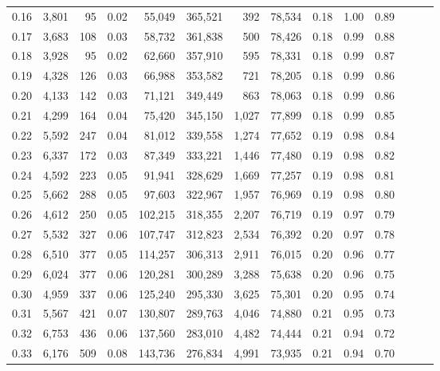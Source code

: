\begin{tabular}{rrrrrrrrrrrrrr}
0.16 &   3,801 &     95 &  0.02 &   55,049 &  365,521 &     392 &  78,534 &  0.18 &  1.00 &      0.89 \\
0.17 &   3,683 &    108 &  0.03 &   58,732 &  361,838 &     500 &  78,426 &  0.18 &  0.99 &      0.88 \\
0.18 &   3,928 &     95 &  0.02 &   62,660 &  357,910 &     595 &  78,331 &  0.18 &  0.99 &      0.87 \\
0.19 &   4,328 &    126 &  0.03 &   66,988 &  353,582 &     721 &  78,205 &  0.18 &  0.99 &      0.86 \\
0.20 &   4,133 &    142 &  0.03 &   71,121 &  349,449 &     863 &  78,063 &  0.18 &  0.99 &      0.86 \\
0.21 &   4,299 &    164 &  0.04 &   75,420 &  345,150 &   1,027 &  77,899 &  0.18 &  0.99 &      0.85 \\
0.22 &   5,592 &    247 &  0.04 &   81,012 &  339,558 &   1,274 &  77,652 &  0.19 &  0.98 &      0.84 \\
0.23 &   6,337 &    172 &  0.03 &   87,349 &  333,221 &   1,446 &  77,480 &  0.19 &  0.98 &      0.82 \\
0.24 &   4,592 &    223 &  0.05 &   91,941 &  328,629 &   1,669 &  77,257 &  0.19 &  0.98 &      0.81 \\
0.25 &   5,662 &    288 &  0.05 &   97,603 &  322,967 &   1,957 &  76,969 &  0.19 &  0.98 &      0.80 \\
0.26 &   4,612 &    250 &  0.05 &  102,215 &  318,355 &   2,207 &  76,719 &  0.19 &  0.97 &      0.79 \\
0.27 &   5,532 &    327 &  0.06 &  107,747 &  312,823 &   2,534 &  76,392 &  0.20 &  0.97 &      0.78 \\
0.28 &   6,510 &    377 &  0.05 &  114,257 &  306,313 &   2,911 &  76,015 &  0.20 &  0.96 &      0.77 \\
0.29 &   6,024 &    377 &  0.06 &  120,281 &  300,289 &   3,288 &  75,638 &  0.20 &  0.96 &      0.75 \\
0.30 &   4,959 &    337 &  0.06 &  125,240 &  295,330 &   3,625 &  75,301 &  0.20 &  0.95 &      0.74 \\
0.31 &   5,567 &    421 &  0.07 &  130,807 &  289,763 &   4,046 &  74,880 &  0.21 &  0.95 &      0.73 \\
0.32 &   6,753 &    436 &  0.06 &  137,560 &  283,010 &   4,482 &  74,444 &  0.21 &  0.94 &      0.72 \\
0.33 &   6,176 &    509 &  0.08 &  143,736 &  276,834 &   4,991 &  73,935 &  0.21 &  0.94 &      0.70 \\

\end{tabular}
